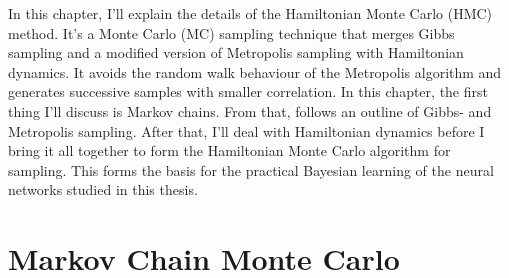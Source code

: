 In this chapter, I'll explain the details of the Hamiltonian Monte Carlo (HMC) method.
It's a Monte Carlo (MC) sampling technique that merges Gibbs sampling and a modified version of Metropolis sampling
with Hamiltonian dynamics. It avoids the random walk behaviour of the Metropolis algorithm
and generates successive samples with smaller correlation. In this chapter, the first thing I'll discuss is Markov chains.
From that, follows an outline of Gibbs- and Metropolis sampling. After that, I'll deal with Hamiltonian dynamics before I bring it all together
to form the Hamiltonian Monte Carlo algorithm for sampling. This forms the basis for the practical Bayesian learning of the neural networks studied in this thesis.

\section{Markov Chain Monte Carlo}\label{sec:mcmc}
\begin{comment}
  The treatment of Markov chains largely follows the presentation in \cite{markov_chains}. A Markov process is a scheme that from a given state (or value) $\mu$ generates a new state $\nu$ with a \textit{transition} probability $T(\nu|\mu)$. A Markov process has the following properties
\begin{itemize}
  \item The transition probabilities $T(\nu|\mu)$ are time-independent.
  \item $T(\nu|\mu)$ only depend on the states $\mu$ and $\nu$.
  \item The transition $\mu \to \mu$ is allowed, thus $T(\mu|\mu) > 0$. Hence, the new generated state may just be the same as the previous state.
  \item The transition probabilties must sum to unity, hence $\int_{\nu} T(\nu|\mu) = 1$. In other words, the procedure must generate some new state.
\end{itemize}

Two important principles, originally found by Metropolis et. al \cite{metropolis}, were introduced to make the MCMC chains computationally feasible. 
\begin{enumerate}
  \item \textbf{Ergodicity}: Any state $\nu$ can be reached from any other state $\mu$ given a long enough MCMC chain.
  \item \textbf{Detailed balance}: If the transition probabilities $T(\nu|\mu)$ obey the detailed balance equation, $$P(\mu)T(\nu|\mu) = P(\nu)T(\mu|\nu),$$
      then the Markov chain is guaranteed to be ergodic. The interpretation of this is that on average, the system makes the transition $\mu \to \nu$ just as often as the transition $\nu \to \mu$.
\end{enumerate}
\end{comment}

